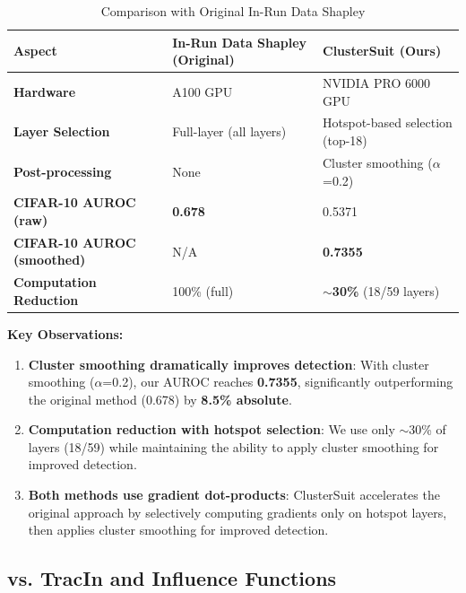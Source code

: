 \documentclass[12pt,a4paper]{report}
\begin{document}
\begin{table}[htbp]
    \centering
    \caption{Comparison with Original In-Run Data Shapley}
    \begin{tabular}{lll}
        \toprule
        \textbf{Aspect} & \textbf{In-Run Data Shapley (Original)} & \textbf{ClusterSuit (Ours)} \\
        \midrule
        \textbf{Hardware} & A100 GPU & NVIDIA PRO 6000 GPU \\
        \textbf{Layer Selection} & Full-layer (all layers) & Hotspot-based selection (top-18) \\
        \textbf{Post-processing} & None & Cluster smoothing ($\alpha$=0.2) \\
        \textbf{CIFAR-10 AUROC (raw)} & \textbf{0.678} & 0.5371 \\
        \textbf{CIFAR-10 AUROC (smoothed)} & N/A & \textbf{0.7355} \\
        \textbf{Computation Reduction} & 100\% (full) & \textbf{$\sim$30\%} (18/59 layers) \\
        \bottomrule
    \end{tabular}
    \label{tab:inrun_comparison}
\end{table}

\bigskip
\noindent \textbf{Key Observations:}

\begin{enumerate}
    \item \textbf{Cluster smoothing dramatically improves detection}: With cluster smoothing ($\alpha$=0.2), our AUROC reaches \textbf{0.7355}, significantly outperforming the original method (0.678) by \textbf{8.5\% absolute}.
    
    \item \textbf{Computation reduction with hotspot selection}: We use only $\sim$30\% of layers (18/59) while maintaining the ability to apply cluster smoothing for improved detection.
    
    \item \textbf{Both methods use gradient dot-products}: ClusterSuit accelerates the original approach by selectively computing gradients only on hotspot layers, then applies cluster smoothing for improved detection.
\end{enumerate}

\subsection{vs. TracIn and Influence Functions}
\label{sec:vs_trak}
\end{document}
